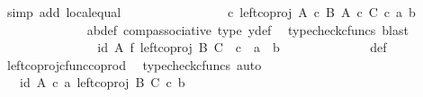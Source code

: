 \begin{isabellebody}
\ {\isacharparenleft}{\kern0pt}simp\ add{\isacharcolon}{\kern0pt}\ local{\isachardot}{\kern0pt}equal{\isacharparenright}{\kern0pt}\isanewline
\ \ \ \ \ \ \ \ \ \ \isamarkupfalse%
\ \isamarkupfalse%
\ {\isachardoublequoteopen}{\isachardot}{\kern0pt}{\isachardot}{\kern0pt}{\isachardot}{\kern0pt}\ {\isacharequal}{\kern0pt}\ {\isacharparenleft}{\kern0pt}{\isasymphi}\ {\isasymcirc}\isactrlsub c\ left{\isacharunderscore}{\kern0pt}coproj\ {\isacharparenleft}{\kern0pt}A\ {\isasymtimes}\isactrlsub c\ B{\isacharparenright}{\kern0pt}\ {\isacharparenleft}{\kern0pt}A\ {\isasymtimes}\isactrlsub c\ C{\isacharparenright}{\kern0pt}{\isacharparenright}{\kern0pt}\ {\isasymcirc}\isactrlsub c\ {\isasymlangle}a{\isacharprime}{\kern0pt}{\isacharcomma}{\kern0pt}\ b{\isacharprime}{\kern0pt}{\isasymrangle}{\isachardoublequoteclose}\isanewline
\ \ \ \ \ \ \ \ \ \ \ \ \isamarkupfalse%
\ a{\isacharprime}{\kern0pt}b{\isacharprime}{\kern0pt}{\isacharunderscore}{\kern0pt}def\ comp{\isacharunderscore}{\kern0pt}associative{}\ {\isasymphi}{\isacharunderscore}{\kern0pt}type\ y{\isacharprime}{\kern0pt}{\isacharunderscore}{\kern0pt}def\ \isamarkupfalse%
\ {\isacharparenleft}{\kern0pt}typecheck{\isacharunderscore}{\kern0pt}cfuncs{\isacharcomma}{\kern0pt}\ blast{\isacharparenright}{\kern0pt}\isanewline
\ \ \ \ \ \ \ \ \ \ \isamarkupfalse%
\ \isamarkupfalse%
\ {\isachardoublequoteopen}{\isachardot}{\kern0pt}{\isachardot}{\kern0pt}{\isachardot}{\kern0pt}\ {\isacharequal}{\kern0pt}\ {\isacharparenleft}{\kern0pt}id\ A\ {\isasymtimes}\isactrlsub f\ left{\isacharunderscore}{\kern0pt}coproj\ B\ C{\isacharparenright}{\kern0pt}\ \ {\isasymcirc}\isactrlsub c\ {\isasymlangle}\ a{\isacharprime}{\kern0pt}{\isacharcomma}{\kern0pt}\ \ b{\isacharprime}{\kern0pt}{\isasymrangle}{\isachardoublequoteclose}\isanewline
\ \ \ \ \ \ \ \ \ \ \ \ \isamarkupfalse%
\ {\isasymphi}{\isacharunderscore}{\kern0pt}def\ \isamarkupfalse%
\ left{\isacharunderscore}{\kern0pt}coproj{\isacharunderscore}{\kern0pt}cfunc{\isacharunderscore}{\kern0pt}coprod\ \isamarkupfalse%
\ {\isacharparenleft}{\kern0pt}typecheck{\isacharunderscore}{\kern0pt}cfuncs{\isacharcomma}{\kern0pt}\ auto{\isacharparenright}{\kern0pt}\isanewline
\ \ \ \ \ \ \ \ \ \ \isamarkupfalse%
\ \isamarkupfalse%
\ {\isachardoublequoteopen}{\isachardot}{\kern0pt}{\isachardot}{\kern0pt}{\isachardot}{\kern0pt}\ {\isacharequal}{\kern0pt}\ {\isasymlangle}id\ A\ {\isasymcirc}\isactrlsub c\ a{\isacharprime}{\kern0pt}{\isacharcomma}{\kern0pt}\ left{\isacharunderscore}{\kern0pt}coproj\ B\ C\ {\isasymcirc}\isactrlsub c\ b{\isacharprime}{\kern0pt}{\isasymrangle}{\isachardoublequoteclose}\isanewline

\end{isabellebody}
